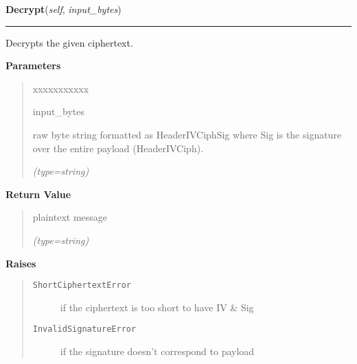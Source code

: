 \hspace{.8\funcindent}\begin{boxedminipage}{\funcwidth}

    \raggedright \textbf{Decrypt}(\textit{self}, \textit{input\_bytes})

    \vspace{-1.5ex}

    \rule{\textwidth}{0.5\fboxrule}
\setlength{\parskip}{2ex}
    Decrypts the given ciphertext.

\setlength{\parskip}{1ex}
      \textbf{Parameters}
      \vspace{-1ex}

      \begin{quote}
        \begin{Ventry}{xxxxxxxxxxx}

          \item[input\_bytes]

          raw byte string formatted as 
          Header{\textbar}IV{\textbar}Ciph{\textbar}Sig where Sig is the 
          signature over the entire payload 
          (Header{\textbar}IV{\textbar}Ciph).

            {\it (type=string)}

        \end{Ventry}

      \end{quote}

      \textbf{Return Value}
    \vspace{-1ex}

      \begin{quote}
      plaintext message

      {\it (type=string)}

      \end{quote}

      \textbf{Raises}
    \vspace{-1ex}

      \begin{quote}
        \begin{description}

          \item[\texttt{ShortCiphertextError}]

          if the ciphertext is too short to have IV \& Sig

          \item[\texttt{InvalidSignatureError}]

          if the signature doesn't correspond to payload

        \end{description}

      \end{quote}

    \end{boxedminipage}


